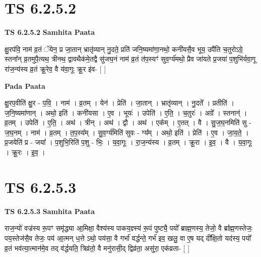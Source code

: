 \documentclass[17pt]{extarticle}
\begin{document}
\section*{ TS 6.2.5.2 }

\textbf{TS 6.2.5.2 } \newline
\textbf{Samhita Paata} \newline

क्षु॒रप॑वि॒ नाम॑ व्र॒तं ॅयेन॒ प्र जा॒तान् भ्रातृ॑व्यान् नु॒दते॒ प्रति॑ जनि॒ष्यमा॑णा॒नथो॒ कनी॑यसै॒व भूय॒ उपै॑ति च॒तुरोऽग्रे॒ स्तना᳚न् व्र॒तमुपै॒त्यथ॒ त्रीनथ॒ द्वावथैक॑मे॒तद्वै सु॑जघ॒नं नाम॑ व्र॒तं त॑प॒स्यꣳ॑ सुव॒र्ग्य॑मथो॒ प्रैव जा॑यते प्र॒जया॑ प॒शुभि॑र्यवा॒गू रा॑ज॒न्य॑स्य व्र॒तं क्रू॒रेव॒ वै य॑वा॒गूः क्रू॒र इ॑व- [  ] \newline

\textbf{Pada Paata} \newline

क्षु॒रप॒वीति॑ क्षु॒र - प॒वि॒ । नाम॑ । व्र॒तम् । येन॑ । प्रेति॑ । जा॒तान् । भ्रातृ॑व्यान् । नु॒दते᳚ । प्रतीति॑ । ज॒नि॒ष्यमा॑णान् । अथो॒ इति॑ । कनी॑यसा । ए॒व । भूयः॑ । उपेति॑ । ए॒ति॒ । च॒तुरः॑ । अग्रे᳚ । स्तनान्॑ । व्र॒तम् । उपेति॑ । ए॒ति॒ । अथ॑ । त्रीन् । अथ॑ । द्वौ । अथ॑ । एक᳚म् । ए॒तत् । वै । सु॒ज॒घ॒नमिति॑ सु - ज॒घ॒नम् । नाम॑ । व्र॒तम् । त॒प॒स्य᳚म् । सु॒व॒र्ग्य॑मिति॑ सुवः - ग्य᳚म् । अथो॒ इति॑ । प्रेति॑ । ए॒व । जा॒य॒ते॒ । प्र॒जयेति॑ प्र - जया᳚ । प॒शुभि॒रिति॑ प॒शु - भिः॒ । य॒वा॒गूः । रा॒ज॒न्य॑स्य । व्र॒तम् । क्रू॒रा । इ॒व॒ । वै । य॒वा॒गूः । क्रू॒रः । इ॒व॒ ।  \newline




\section*{ TS 6.2.5.3 }

\textbf{TS 6.2.5.3 } \newline
\textbf{Samhita Paata} \newline

राज॒न्यो॑ वज्र॑स्य रू॒पꣳ समृ॑द्ध्या आ॒मिक्षा॒ वैश्य॑स्य पाकय॒ज्ञ्स्य॑ रू॒पं पुष्ट्यै॒ पयो᳚ ब्राह्म॒णस्य॒ तेजो॒ वै ब्रा᳚ह्म॒णस्तेजः॒ पय॒स्तेज॑सै॒व तेजः॒ पय॑ आ॒त्मन् ध॒त्ते ऽथो॒ पय॑सा॒ वै गर्भा॑ वर्द्धन्ते॒ गर्भ॑ इव॒ खलु॒ वा ए॒ष यद् दी᳚क्षि॒तो यद॑स्य॒ पयो᳚ व्र॒तं भव॑त्या॒त्मान॑मे॒व तद् व॑र्द्धयति॒ त्रिव्र॑तो॒ वै मनु॑रासी॒द् द्विव्र॑ता॒ असु॑रा॒ एक॑व्रता- [  ] \newline
\end{document}
